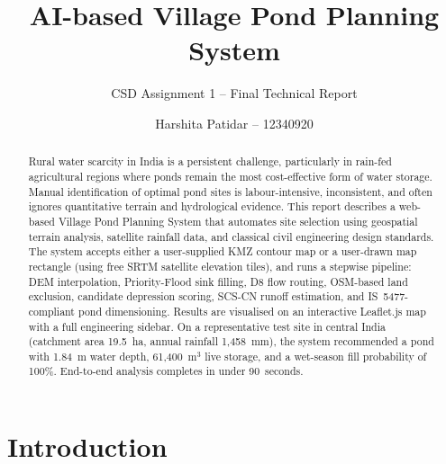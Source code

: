 \documentclass[manuscript,screen,review,nonacm]{acmart}
\begin{document}
\title{AI-based Village Pond Planning System}
\subtitle{CSD Assignment 1 -- Final Technical Report}

\author{Harshita Patidar -- 12340920}

\renewcommand{\shortauthors}{Patidar}

\begin{abstract}
Rural water scarcity in India is a persistent challenge, particularly in
rain-fed agricultural regions where ponds remain the most cost-effective
form of water storage. Manual identification of optimal pond sites is
labour-intensive, inconsistent, and often ignores quantitative terrain and
hydrological evidence. This report describes a web-based Village Pond
Planning System that automates site selection using geospatial terrain
analysis, satellite rainfall data, and classical civil engineering design
standards. The system accepts either a user-supplied KMZ contour map or a
user-drawn map rectangle (using free SRTM satellite elevation tiles), and
runs a stepwise pipeline: DEM interpolation, Priority-Flood sink filling,
D8 flow routing, OSM-based land exclusion, candidate depression scoring,
SCS-CN runoff estimation, and IS~5477-compliant pond dimensioning. Results
are visualised on an interactive Leaflet.js map with a full engineering
sidebar. On a representative test site in central India (catchment area
19.5~ha, annual rainfall 1,458~mm), the system recommended a pond with
1.84~m water depth, 61,400~m$^3$ live storage, and a wet-season fill
probability of 100\%. End-to-end analysis completes in under 90~seconds.
\end{abstract}


\maketitle

\section{Introduction}
\label{sec:intro}
\end{document}
